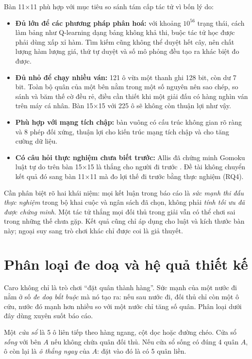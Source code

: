 Bàn 11×11 phù hợp với mục tiêu so sánh tám cấp tác tử vì bốn lý do:
\begin{itemize}
  \item \textbf{Đủ lớn để các phương pháp phân hoá:} với khoảng $10^{56}$ trạng thái, cách làm bảng như Q-learning dạng bảng không khả thi, buộc tác tử học được phải dùng xấp xỉ hàm. Tìm kiếm cũng không thể duyệt hết cây, nên chất lượng hàm lượng giá, thứ tự duyệt và số mô phỏng đều tạo ra khác biệt đo được.
  \item \textbf{Đủ nhỏ để chạy nhiều ván:} 121 ô vừa một thanh ghi 128 bit, còn dư 7 bit. Toàn bộ quân của một bên nằm trong một số nguyên nên sao chép, so sánh và băm thế cờ đều rẻ, điều cần thiết khi một giải đấu có hàng nghìn ván trên máy cá nhân. Bàn 15×15 với 225 ô sẽ không còn thuận lợi như vậy.
  \item \textbf{Phù hợp với mạng tích chập:} bàn vuông có cấu trúc không gian rõ ràng và 8 phép đối xứng, thuận lợi cho kiến trúc mạng tích chập và cho tăng cường dữ liệu.
  \item \textbf{Có câu hỏi thực nghiệm chưa biết trước:} Allis đã chứng minh Gomoku luật tự do trên bàn 15×15 là thắng cho người đi trước \cite{allis1994}. Đề tài không chuyển kết quả đó sang bàn 11×11 mà đo lợi thế đi trước bằng thực nghiệm (RQ4).
\end{itemize}

Cần phân biệt rõ hai khái niệm: mọi kết luận trong báo cáo là \emph{sức mạnh thi đấu thực nghiệm} trong bộ khai cuộc và ngân sách đã chọn, không phải \emph{tính tối ưu đã được chứng minh}. Một tác tử thắng mọi đối thủ trong giải vẫn có thể chơi sai trong những thế chưa gặp. Kết quả cũng chỉ áp dụng cho luật và kích thước bàn này; ngoại suy sang trò chơi khác chỉ được coi là giả thuyết.

\section{Phân loại đe doạ và hệ quả thiết kế}
\label{sec:gt-de-doa}
Caro không chỉ là trò chơi ``đặt quân thành hàng''. Sức mạnh của một nước đi nằm ở số \emph{đe
doạ bắt buộc} mà nó tạo ra: nếu sau nước đi, đối thủ chỉ còn một ô cứu, nước đó mạnh hơn nhiều
so với một nước chỉ tăng số quân. Phân loại dưới đây dùng xuyên suốt báo cáo.

\begin{dinhnghia}
Một \emph{cửa sổ} là 5 ô liên tiếp theo hàng ngang, cột dọc hoặc đường chéo. Cửa sổ \emph{sống}
với bên $A$ nếu không chứa quân đối thủ. Nếu cửa sổ sống có đúng 4 quân $A$, ô còn lại là
\emph{ô thắng ngay} của $A$: đặt vào đó là có 5 quân liền.
\end{dinhnghia}

